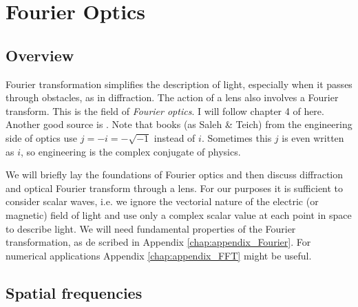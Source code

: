 \renewcommand{\lastmod}{October 16, 2023}
\renewcommand{\chapterauthors}{Markus Lippitz}

\chapter{Fourier Optics}





\section{Overview}
Fourier transformation simplifies the description of light, especially when it passes through obstacles, as in diffraction. The action of a lens also involves a Fourier transform. This is the field of \emph{Fourier optics}. I will follow chapter 4 of \cite{SalehTeich1991} here. Another good source is \cite{Goodman2005}. Note that books (as Saleh \& Teich) from the engineering  side of optics use $j = - i = - \sqrt{-1}$ instead of $i$. Sometimes this $j$ is even written as $i$, so engineering is the complex conjugate of physics.


We will briefly lay the foundations of Fourier optics and then discuss diffraction and optical Fourier transform through a lens. For our purposes it is sufficient to consider scalar waves, i.e. we ignore the vectorial nature of the electric (or magnetic) field of light and use only a complex scalar value at each point in space to describe light. We will need fundamental properties of the Fourier transformation, as de scribed in Appendix \ref{chap:appendix_Fourier}. For numerical applications Appendix \ref{chap:appendix_FFT}
might be useful.

\section{Spatial frequencies}

